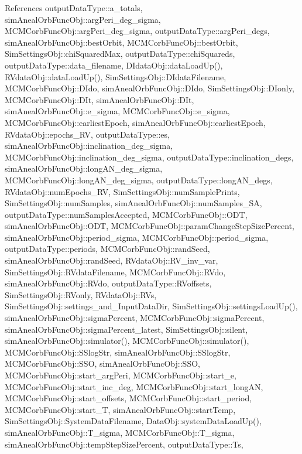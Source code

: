 References output\-Data\-Type\-::a\-\_\-totals, sim\-Aneal\-Orb\-Func\-Obj\-::arg\-Peri\-\_\-deg\-\_\-sigma, M\-C\-M\-Corb\-Func\-Obj\-::arg\-Peri\-\_\-deg\-\_\-sigma, output\-Data\-Type\-::arg\-Peri\-\_\-degs, sim\-Aneal\-Orb\-Func\-Obj\-::best\-Orbit, M\-C\-M\-Corb\-Func\-Obj\-::best\-Orbit, Sim\-Settings\-Obj\-::chi\-Squared\-Max, output\-Data\-Type\-::chi\-Squareds, output\-Data\-Type\-::data\-\_\-filename, D\-Idata\-Obj\-::data\-Load\-Up(), R\-Vdata\-Obj\-::data\-Load\-Up(), Sim\-Settings\-Obj\-::\-D\-Idata\-Filename, M\-C\-M\-Corb\-Func\-Obj\-::\-D\-Ido, sim\-Aneal\-Orb\-Func\-Obj\-::\-D\-Ido, Sim\-Settings\-Obj\-::\-D\-Ionly, M\-C\-M\-Corb\-Func\-Obj\-::\-D\-It, sim\-Aneal\-Orb\-Func\-Obj\-::\-D\-It, sim\-Aneal\-Orb\-Func\-Obj\-::e\-\_\-sigma, M\-C\-M\-Corb\-Func\-Obj\-::e\-\_\-sigma, M\-C\-M\-Corb\-Func\-Obj\-::earliest\-Epoch, sim\-Aneal\-Orb\-Func\-Obj\-::earliest\-Epoch, R\-Vdata\-Obj\-::epochs\-\_\-\-R\-V, output\-Data\-Type\-::es, sim\-Aneal\-Orb\-Func\-Obj\-::inclination\-\_\-deg\-\_\-sigma, M\-C\-M\-Corb\-Func\-Obj\-::inclination\-\_\-deg\-\_\-sigma, output\-Data\-Type\-::inclination\-\_\-degs, sim\-Aneal\-Orb\-Func\-Obj\-::long\-A\-N\-\_\-deg\-\_\-sigma, M\-C\-M\-Corb\-Func\-Obj\-::long\-A\-N\-\_\-deg\-\_\-sigma, output\-Data\-Type\-::long\-A\-N\-\_\-degs, R\-Vdata\-Obj\-::num\-Epochs\-\_\-\-R\-V, Sim\-Settings\-Obj\-::num\-Sample\-Prints, Sim\-Settings\-Obj\-::num\-Samples, sim\-Aneal\-Orb\-Func\-Obj\-::num\-Samples\-\_\-\-S\-A, output\-Data\-Type\-::num\-Samples\-Accepted, M\-C\-M\-Corb\-Func\-Obj\-::\-O\-D\-T, sim\-Aneal\-Orb\-Func\-Obj\-::\-O\-D\-T, M\-C\-M\-Corb\-Func\-Obj\-::param\-Change\-Step\-Size\-Percent, sim\-Aneal\-Orb\-Func\-Obj\-::period\-\_\-sigma, M\-C\-M\-Corb\-Func\-Obj\-::period\-\_\-sigma, output\-Data\-Type\-::periods, M\-C\-M\-Corb\-Func\-Obj\-::rand\-Seed, sim\-Aneal\-Orb\-Func\-Obj\-::rand\-Seed, R\-Vdata\-Obj\-::\-R\-V\-\_\-inv\-\_\-var, Sim\-Settings\-Obj\-::\-R\-Vdata\-Filename, M\-C\-M\-Corb\-Func\-Obj\-::\-R\-Vdo, sim\-Aneal\-Orb\-Func\-Obj\-::\-R\-Vdo, output\-Data\-Type\-::\-R\-Voffsets, Sim\-Settings\-Obj\-::\-R\-Vonly, R\-Vdata\-Obj\-::\-R\-Vs, Sim\-Settings\-Obj\-::settings\-\_\-and\-\_\-\-Input\-Data\-Dir, Sim\-Settings\-Obj\-::settings\-Load\-Up(), sim\-Aneal\-Orb\-Func\-Obj\-::sigma\-Percent, M\-C\-M\-Corb\-Func\-Obj\-::sigma\-Percent, sim\-Aneal\-Orb\-Func\-Obj\-::sigma\-Percent\-\_\-latest, Sim\-Settings\-Obj\-::silent, sim\-Aneal\-Orb\-Func\-Obj\-::simulator(), M\-C\-M\-Corb\-Func\-Obj\-::simulator(), M\-C\-M\-Corb\-Func\-Obj\-::\-S\-Slog\-Str, sim\-Aneal\-Orb\-Func\-Obj\-::\-S\-Slog\-Str, M\-C\-M\-Corb\-Func\-Obj\-::\-S\-S\-O, sim\-Aneal\-Orb\-Func\-Obj\-::\-S\-S\-O, M\-C\-M\-Corb\-Func\-Obj\-::start\-\_\-arg\-Peri, M\-C\-M\-Corb\-Func\-Obj\-::start\-\_\-e, M\-C\-M\-Corb\-Func\-Obj\-::start\-\_\-inc\-\_\-deg, M\-C\-M\-Corb\-Func\-Obj\-::start\-\_\-long\-A\-N, M\-C\-M\-Corb\-Func\-Obj\-::start\-\_\-offsets, M\-C\-M\-Corb\-Func\-Obj\-::start\-\_\-period, M\-C\-M\-Corb\-Func\-Obj\-::start\-\_\-\-T, sim\-Aneal\-Orb\-Func\-Obj\-::start\-Temp, Sim\-Settings\-Obj\-::\-System\-Data\-Filename, Data\-Obj\-::system\-Data\-Load\-Up(), sim\-Aneal\-Orb\-Func\-Obj\-::\-T\-\_\-sigma, M\-C\-M\-Corb\-Func\-Obj\-::\-T\-\_\-sigma, sim\-Aneal\-Orb\-Func\-Obj\-::temp\-Step\-Size\-Percent, output\-Data\-Type\-::\-Ts, 